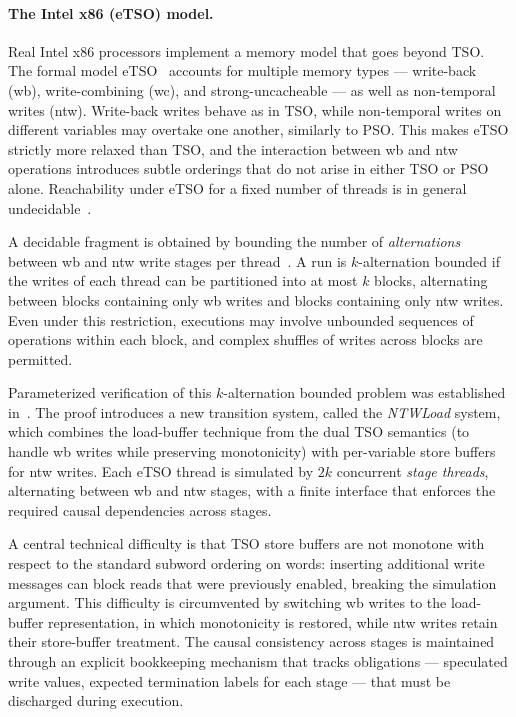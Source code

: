 \paragraph{The Intel x86 (eTSO) model.}
Real Intel x86 processors implement a memory model that goes beyond TSO.
The formal model eTSO~\cite{eTSO_model} accounts for multiple memory types
--- write-back (wb), write-combining (wc), and strong-uncacheable --- as well
as non-temporal writes (ntw). Write-back writes behave as in TSO, while
non-temporal writes on different variables may overtake one another, similarly
to PSO. This makes eTSO strictly more relaxed than TSO, and the interaction
between wb and ntw operations introduces subtle orderings that do not arise
in either TSO or PSO alone. Reachability under eTSO for a fixed number of
threads is in general undecidable~\cite{eTSO_undec}.

A decidable fragment is obtained by bounding the number of \emph{alternations}
between wb and ntw write stages per thread~\cite{eTSO_kalternation}. A run
is $k$-alternation bounded if the writes of each thread can be partitioned
into at most $k$ blocks, alternating between blocks containing only wb writes
and blocks containing only ntw writes. Even under this restriction, executions
may involve unbounded sequences of operations within each block, and complex
shuffles of writes across blocks are permitted.

Parameterized verification of this $k$-alternation bounded problem was
established in~\cite{eTSO_param}. The proof introduces a new transition
system, called the \emph{NTWLoad} system, which combines the load-buffer
technique from the dual TSO semantics (to handle wb writes while preserving
monotonicity) with per-variable store buffers for ntw writes. Each eTSO
thread is simulated by $2k$ concurrent \emph{stage threads}, alternating
between wb and ntw stages, with a finite interface that enforces the required
causal dependencies across stages.

A central technical difficulty is that TSO store buffers are not monotone with
respect to the standard subword ordering on words: inserting additional write
messages can block reads that were previously enabled, breaking the simulation
argument. This difficulty is circumvented by switching wb writes to the
load-buffer representation, in which monotonicity is restored, while ntw
writes retain their store-buffer treatment. The causal consistency across
stages is maintained through an explicit bookkeeping mechanism that tracks
obligations --- speculated write values, expected termination labels for each
stage --- that must be discharged during execution.

